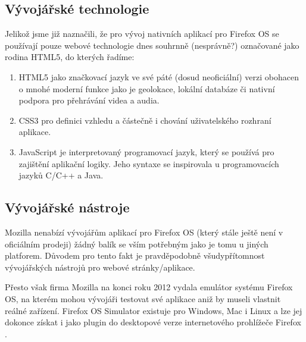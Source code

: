 \subsection{Vývojářské technologie}
Jelikož jsme již naznačili, že pro vývoj nativních aplikací pro Firefox OS se používají pouze webové technologie dnes souhrnně (nesprávně?) označované jako rodina HTML5, do kterých řadíme:

\begin{enumerate}
	\item HTML5 jako značkovací jazyk ve své páté (dosud neoficiální) verzi obohacen o mnohé moderní funkce jako je geolokace, lokální databáze či nativní podpora pro přehrávání videa a audia.
	\item CSS3 pro definici vzhledu a částečně i chování uživatelského rozhraní aplikace.
	\item JavaScript je interpretovaný programovací jazyk, který se používá pro zajištění aplikační logiky. Jeho syntaxe se inspirovala u programovacích jazyků C/C++ a Java.
\end{enumerate}

\subsection{Vývojářské nástroje}
Mozilla nenabízí vývojářům aplikací pro Firefox OS (který stále ještě není v oficiálním prodeji) žádný balík se vším potřebným jako je tomu u jiných platforem. Důvodem pro tento fakt je pravděpodobně všudypřítomnost vývojářských nástrojů pro webové stránky/aplikace.

Přesto však firma Mozilla na konci roku 2012 vydala emulátor systému Firefox OS, na kterém mohou vývojáři testovat své aplikace aniž by museli vlastnit reálné zařízení. Firefox OS Simulator existuje pro Windows, Mac i Linux a lze jej dokonce získat i jako plugin do desktopové verze internetového prohlížeče Firefox \cite{announcing_fxOS_simulator}.